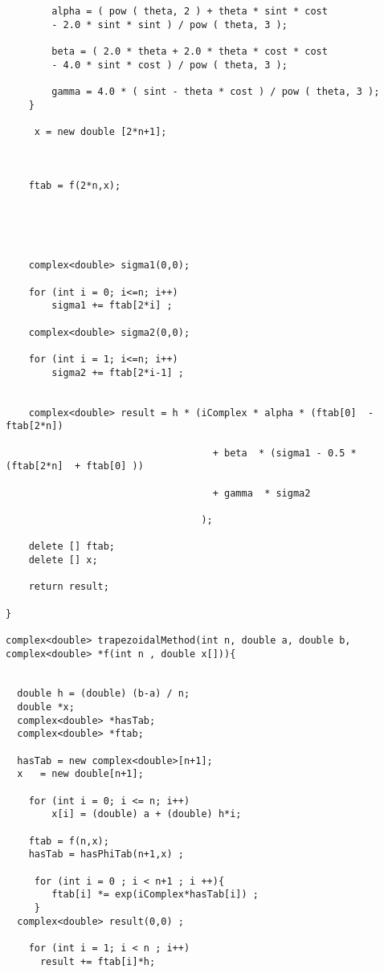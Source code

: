 \begin{lstlisting}
        alpha = ( pow ( theta, 2 ) + theta * sint * cost 
        - 2.0 * sint * sint ) / pow ( theta, 3 );

        beta = ( 2.0 * theta + 2.0 * theta * cost * cost
        - 4.0 * sint * cost ) / pow ( theta, 3 );

        gamma = 4.0 * ( sint - theta * cost ) / pow ( theta, 3 );
    }
    
     x = new double [2*n+1];

   
        
    ftab = f(2*n,x); 
    


   

    complex<double> sigma1(0,0);

    for (int i = 0; i<=n; i++)
        sigma1 += ftab[2*i] ;

    complex<double> sigma2(0,0);

    for (int i = 1; i<=n; i++)
        sigma2 += ftab[2*i-1] ;


    complex<double> result = h * (iComplex * alpha * (ftab[0]  - ftab[2*n]) 
                                   
                                    + beta  * (sigma1 - 0.5 * (ftab[2*n]  + ftab[0] ))
                                   
                                    + gamma  * sigma2

                                  );

    delete [] ftab;
    delete [] x;

    return result;

}

complex<double> trapezoidalMethod(int n, double a, double b, complex<double> *f(int n , double x[])){
  
      
  double h = (double) (b-a) / n;
  double *x;
  complex<double> *hasTab;
  complex<double> *ftab;

  hasTab = new complex<double>[n+1];
  x   = new double[n+1]; 

    for (int i = 0; i <= n; i++)
        x[i] = (double) a + (double) h*i; 

    ftab = f(n,x); 
    hasTab = hasPhiTab(n+1,x) ;
               
     for (int i = 0 ; i < n+1 ; i ++){                              
        ftab[i] *= exp(iComplex*hasTab[i]) ;
     }
  complex<double> result(0,0) ;

    for (int i = 1; i < n ; i++)
      result += ftab[i]*h;
  

\end{lstlisting}
